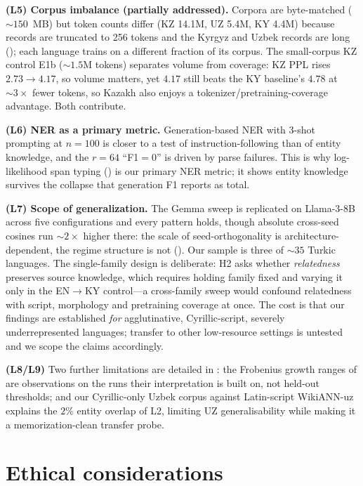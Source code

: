 \documentclass[11pt]{article}
\begin{document}
\textbf{(L5) Corpus imbalance (partially addressed).} Corpora are byte-matched (${\sim}150$~MB) but token counts differ (KZ 14.1M, UZ 5.4M, KY 4.4M) because records are truncated to 256 tokens and the Kyrgyz and Uzbek records are long (); each language trains on a different fraction of its corpus. The small-corpus KZ control E1b (${\sim}1.5$M tokens) separates volume from coverage: KZ PPL rises $2.73\to4.17$, so volume matters, yet $4.17$ still beats the KY baseline's $4.78$ at ${\sim}3\times$ fewer tokens, so Kazakh also enjoys a tokenizer/pretraining-coverage advantage. Both contribute.

\textbf{(L6) NER as a primary metric.} Generation-based NER with 3-shot prompting at $n{=}100$ is closer to a test of instruction-following than of entity knowledge, and the $r{=}64$ ``F1${=}0$'' is driven by parse failures. This is why log-likelihood span typing () is our primary NER metric; it shows entity knowledge survives the collapse that generation F1 reports as total.

\textbf{(L7) Scope of generalization.} The Gemma sweep is replicated on Llama-3-8B across five configurations and every pattern holds, though absolute cross-seed cosines run ${\sim}2\times$ higher there: the scale of seed-orthogonality is architecture-dependent, the regime structure is not (). Our sample is three of ${\sim}35$ Turkic languages. The single-family design is deliberate: H2 asks whether \emph{relatedness} preserves source knowledge, which requires holding family fixed and varying it only in the EN$\rightarrow$KY control---a cross-family sweep would confound relatedness with script, morphology and pretraining coverage at once. The cost is that our findings are established \emph{for} agglutinative, Cyrillic-script, severely underrepresented languages; transfer to other low-resource settings is untested and we scope the claims accordingly.

\textbf{(L8/L9)} Two further limitations are detailed in : the Frobenius growth ranges of  are observations on the runs their interpretation is built on, not held-out thresholds; and our Cyrillic-only Uzbek corpus against Latin-script WikiANN-uz explains the $2\%$ entity overlap of L2, limiting UZ generalisability while making it a memorization-clean transfer probe.

\section*{Ethical considerations}
\end{document}
